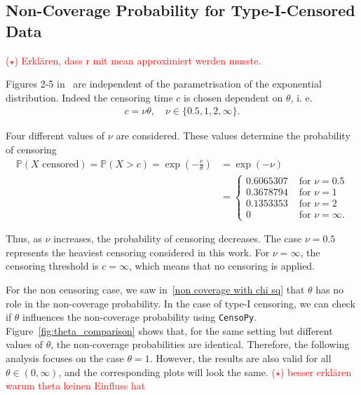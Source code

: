 \subsection{Non-Coverage Probability for Type-I-Censored Data}

\textcolor{red}{($\star$) Erklären, dass r mit mean approximiert werden musste.}


Figures 2-5 in~\cite{Sundberg2001} are independent of the parametrisation of the exponential distribution. Indeed the censoring time $c$ is chosen dependent on $\theta$, i. e.
\begin{align}
	c = \nu \theta, \quad \nu \in \{0.5, 1, 2, \infty\}.
\end{align}

Four different values of $\nu$ are considered. These values determine the 
probability of censoring
\begin{align*}
	\mathbb{P} \left( X \text{ censored} \right)
	=
	\mathbb{P} \left( X > c \right)
	=
	\exp \left( - \frac{c}{\theta} \right)
	&=
	\exp \left( - \nu \right) \\
	&=
	\begin{cases}
		0.6065307 &\text{ for } \nu = 0.5 \\
		0.3678794 &\text{ for } \nu = 1 \\
		0.1353353 &\text{ for } \nu = 2 \\
		0 &\text{ for } \nu = \infty.
	\end{cases}
\end{align*}

Thus, as $\nu$ increases, the probability of censoring decreases. 
The case $\nu = 0.5$ represents the heaviest censoring considered in 
this work. For $\nu = \infty$, the censoring threshold is $c = \infty$, 
which means that no censoring is applied.

For the non censoring case, we saw in~\eqref{non coverage with chi sq} that $\theta$ has no role in the non-coverage probability. In the case of type-I censoring, we can check if $\theta$ influences the non-coverage probability using \texttt{CensoPy}.
Figure~\ref{fig:theta_comparison} shows that, for the same setting but 
different values of $\theta$, the non-coverage probabilities are identical. 
Therefore, the following analysis focuses on the case $\theta = 1$. 
However, the results are also valid for all $\theta \in (0, \infty)$, 
and the corresponding plots will look the same.
\textcolor{red}{($\star$) besser erklären warum theta keinen Einfluss hat}

